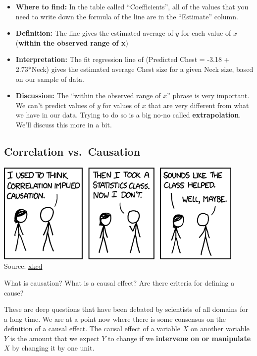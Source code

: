 \documentclass[
]{book}
\providecommand{\tightlist}{%
  \setlength{\itemsep}{0pt}\setlength{\parskip}{0pt}}
\begin{document}
\begin{itemize}
\tightlist
\item
  \textbf{Where to find:} In the table called ``Coefficients'', all of the values that you need to write down the formula of the line are in the ``Estimate'' column.
\item
  \textbf{Definition:} The line gives the estimated average of \(y\) for each value of \(x\) (\textbf{within the observed range of x})
\item
  \textbf{Interpretation:} The fit regression line of (Predicted Chest = -3.18 + 2.73*Neck) gives the estimated average Chest size for a given Neck size, based on our sample of data.
\item
  \textbf{Discussion:} The ``within the observed range of \(x\)'' phrase is very important. We can't predict values of \(y\) for values of \(x\) that are very different from what we have in our data. Trying to do so is a big no-no called \textbf{extrapolation}. We'll discuss this more in a bit.
\end{itemize}

\hypertarget{correlation-vs.-causation}{%
\subsection{Correlation vs.~Causation}\label{correlation-vs.-causation}}

\includegraphics{Photos/correlation.png}
Source: \href{https://xkcd.com/552/}{xkcd}

What is causation? What is a causal effect? Are there criteria for defining a cause?

These are deep questions that have been debated by scientists of all domains for a long time. We are at a point now where there is some consensus on the definition of a causal effect. The causal effect of a variable \(X\) on another variable \(Y\) is the amount that we expect \(Y\) to change if we \textbf{intervene on or manipulate} \(X\) by changing it by one unit.
\end{document}
